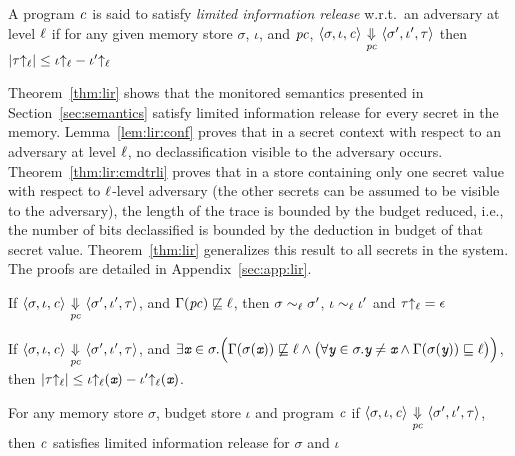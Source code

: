 \begin{mydef}
\label{def:lir:lir}
A program $\mathit{c}$ is said to satisfy \emph{limited information release}
w.r.t.\ an adversary at level $\ell$ if for any given memory
store $\sigma$, %
$\iota$, and $\mathit{pc}$,
$\langle \sigma, \iota, \mathit{c} \rangle {~\underset{\mathit{pc}}{\Downarrow}~} \langle
\sigma', \iota', \tau \rangle$ then $|\tau{\uparrow_\ell}| \leq
\iota{\uparrow_\ell} - \iota'{\uparrow_\ell}$ 
\end{mydef}

Theorem~\ref{thm:lir} shows that the monitored semantics presented in 
Section~\ref{sec:semantics} satisfy limited information release for every 
secret in the memory. 
Lemma~\ref{lem:lir:conf} proves that in a secret context with respect to
an adversary at level $\ell$, no declassification visible to the 
adversary occurs. Theorem~\ref{thm:lir:cmdtrli} proves that in
a store containing only one secret value with respect to 
$\ell$-level adversary (the other secrets can be assumed to be visible 
to the adversary), the length of the trace is bounded by the budget 
reduced, i.e., the number of bits declassified is bounded by the 
deduction in budget of that secret value. Theorem~\ref{thm:lir} 
generalizes this result to all secrets in the system. The proofs are
detailed in Appendix~\ref{sec:app:lir}. 

\begin{myLemma}[Confinement]
  \label{lem:lir:conf}
  If $\langle \sigma, \iota, \mathit{c} \rangle
  {~\underset{\mathit{pc}}{\Downarrow}~} \langle \sigma', \iota', \tau \rangle$,
  and $\Gamma(\mathit{pc}) \not\sqsubseteq \ell$, then 
  $\sigma \sim_\ell \sigma'$, $\iota \sim_\ell \iota'$ and $\tau{\uparrow_\ell} =
  \epsilon$ 
\end{myLemma}

\begin{myThm}
\label{thm:lir:cmdtrli}
If 
$\langle \sigma, \iota, \mathit{c} \rangle {~\underset{\mathit{pc}}{\Downarrow}~} \langle
  \sigma', \iota', \tau \rangle$, and 
$\exists \emph{\texttt{x}} \in \sigma. \Big(\Gamma(\sigma(\emph{\texttt{x}}))
\not\sqsubseteq \ell \wedge \big(\forall \emph{\texttt{y}} \in
\sigma. \emph{\texttt{y}} \neq \emph{\texttt{x}} \wedge 
\Gamma(\sigma(\emph{\texttt{y}})) \sqsubseteq \ell\big)\Big)$, 
then  $|\tau{\uparrow_\ell}| \leq \iota{\uparrow_\ell}(\emph{\texttt{x}}) - \iota'{\uparrow_\ell}(\emph{\texttt{x}})$. 
\end{myThm}

\begin{myThm}
\label{thm:lir}
For any memory store $\sigma$, budget store $\iota$ and program
$\mathit{c}$ if $\langle \sigma, \iota, \mathit{c} \rangle {~\underset{\mathit{pc}}{\Downarrow}~} \langle \sigma',
\iota', \tau \rangle$, then $\mathit{c}$ satisfies limited information release for
$\sigma$ and $\iota$
\end{myThm}
